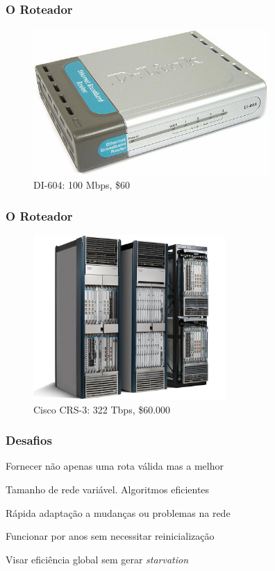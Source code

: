 \documentclass{beamer}
\begin{document}
\begin{frame}
\frametitle{O Roteador}
\begin{figure}[htp]
\begin{center}
  \includegraphics[width=90mm]{Imagens/D-Link.jpg}
  \caption[dlink]{DI-604: 100 Mbps, \$60}
  \label{dlink}
\end{center}
\end{figure}
\end{frame}

\begin{frame}
\frametitle{O Roteador}
\begin{figure}[htp]
\begin{center}
  \includegraphics[width=73mm]{Imagens/Cisco-CRS-3.jpeg}
  \caption[cisco]{Cisco CRS-3: 322 Tbps, \$60.000}
  \label{cisco}
\end{center}
\end{figure}
\end{frame}

\begin{frame}
\frametitle{Desafios}
\begin{description}
  \setlength{\itemsep}{0.7cm}%
  \item[Correção] Fornecer não apenas uma rota válida mas a melhor
  \item[Escalabilidade] Tamanho de rede variável. Algoritmos
  eficientes
  \item[Estabilidade] Rápida adaptação a mudanças ou problemas na rede
  \item[Robustez] Funcionar por anos sem necessitar reinicialização
  \item[Justiça] Visar eficiência global sem gerar \emph{starvation}
\end{description}

\end{frame}
\end{document}
